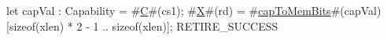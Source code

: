 let capVal : Capability = #\hyperref[sailRISCVzC]{C}#(cs1);
#\hyperref[sailRISCVzX]{X}#(rd) = #\hyperref[sailRISCVzcapToMemBits]{capToMemBits}#(capVal)[sizeof(xlen) * 2 - 1 .. sizeof(xlen)];
RETIRE_SUCCESS

